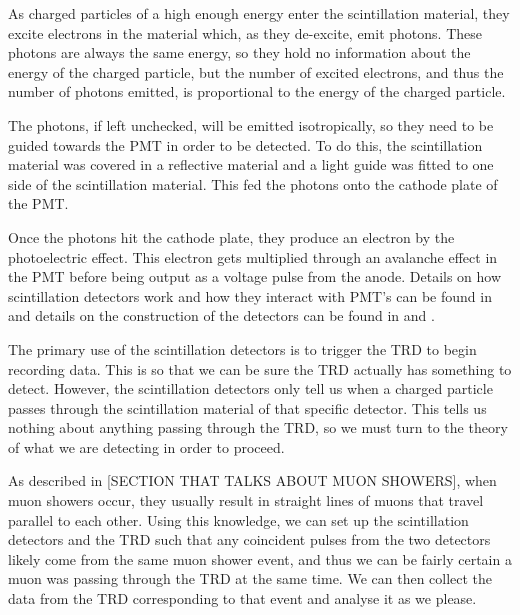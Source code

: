 \documentclass[11pt]{article}
\numberwithin{equation}{section}
\numberwithin{figure}{section}
\numberwithin{table}{section}
\begin{document}
\par As charged particles of a high enough energy enter the scintillation material, they excite electrons in the material which, as they de-excite, emit photons. These photons are always the same energy, so they hold no information about the energy of the charged particle, but the number of excited electrons, and thus the number of photons emitted, is proportional to the energy of the charged particle. 
\par The photons, if left unchecked, will be emitted isotropically, so they need to be guided towards the PMT in order to be detected. To do this, the scintillation material was covered in a reflective material and a light guide was fitted to one side of the scintillation material. This fed the photons onto the cathode plate of the PMT. 
\par Once the photons hit the cathode plate, they produce an electron by the photoelectric effect. This electron gets multiplied through an avalanche effect in the PMT before being output as a voltage pulse from the anode. Details on how scintillation detectors work and how they interact with PMT's can be found in \cite{Knoll} and details on the construction of the detectors can be found in \cite{2018 report} and \cite{2019 report}.
\newline
\par The primary use of the scintillation detectors is to trigger the TRD to begin recording data. This is so that we can be sure the TRD actually has something to detect. However, the scintillation detectors only tell us when a charged particle passes through the scintillation material of that specific detector. This tells us nothing about anything passing through the TRD, so we must turn to the theory of what we are detecting in order to proceed.
\par As described in [SECTION THAT TALKS ABOUT MUON SHOWERS], when muon showers occur, they usually result in straight lines of muons that travel parallel to each other. Using this knowledge, we can set up the scintillation detectors and the TRD such that any coincident pulses from the two detectors likely come from the same muon shower event, and thus we can be fairly certain a muon was passing through the TRD at the same time. We can then collect the data from the TRD corresponding to that event and analyse it as we please.
\end{document}

